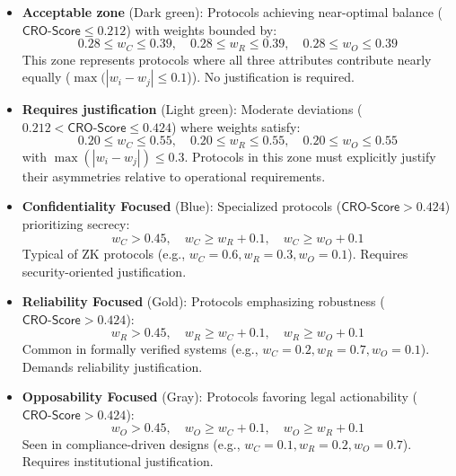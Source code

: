 \documentclass[preprint,12pt]{elsarticle}
\begin{document}
            \begin{itemize}
                \item \textbf{Acceptable zone} (Dark green): Protocols achieving near-optimal balance ($\mathsf{CRO\text{-}Score} \leq 0.212$) with weights bounded by:
                \[
                0.28 \leq w_C \leq 0.39, \quad 
                0.28 \leq w_R \leq 0.39, \quad 
                0.28 \leq w_O \leq 0.39
                \]
                This zone represents protocols where all three attributes contribute nearly equally ($\max(|w_i - w_j| \leq 0.1$)). No justification is required.
                
                \item \textbf{Requires justification} (Light green): Moderate deviations ($0.212 < \mathsf{CRO\text{-}Score} \leq 0.424$) where weights satisfy:
                \[
                0.20 \leq w_C \leq 0.55, \quad 
                0.20 \leq w_R \leq 0.55, \quad 
                0.20 \leq w_O \leq 0.55
                \]
                with $\max(|w_i - w_j|) \leq 0.3$. Protocols in this zone must explicitly justify their asymmetries relative to operational requirements.
                
                \item \textbf{Confidentiality Focused} (Blue): Specialized protocols ($\mathsf{CRO\text{-}Score} > 0.424$) prioritizing secrecy:
                \[
                w_C > 0.45, \quad w_C \geq w_R + 0.1, \quad w_C \geq w_O + 0.1
                \]
                Typical of ZK protocols (e.g., $w_C=0.6, w_R=0.3, w_O=0.1$). Requires security-oriented justification.
                
                \item \textbf{Reliability Focused} (Gold): Protocols emphasizing robustness ($\mathsf{CRO\text{-}Score} > 0.424$):
                \[
                w_R > 0.45, \quad w_R \geq w_C + 0.1, \quad w_R \geq w_O + 0.1
                \]
                Common in formally verified systems (e.g., $w_C=0.2, w_R=0.7, w_O=0.1$). Demands reliability justification.
                
                \item \textbf{Opposability Focused} (Gray): Protocols favoring legal actionability ($\mathsf{CRO\text{-}Score} > 0.424$):
                \[
                w_O > 0.45, \quad w_O \geq w_C + 0.1, \quad w_O \geq w_R + 0.1
                \]
                Seen in compliance-driven designs (e.g., $w_C=0.1, w_R=0.2, w_O=0.7$). Requires institutional justification.
            \end{itemize}
\end{document}
